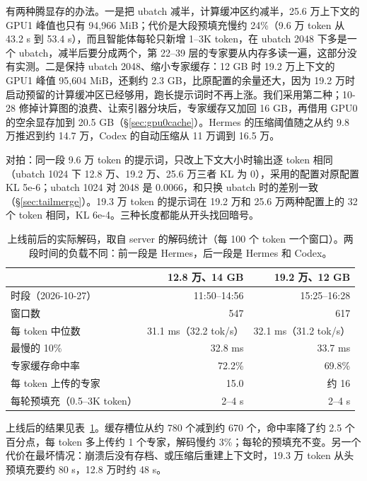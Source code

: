\documentclass[11pt,a4paper]{article}
\newcommand{\tps}{tok/s}
\begin{document}
有两种腾显存的办法。一是把 ubatch 减半，计算缓冲区约减半，25.6 万上下文的 GPU1 峰值也只有 94,966 MiB；代价是大段预填充慢约 24\%（9.6 万 token 从 43.2 s 到 53.4 s），而且智能体每轮只新增 1--3K token，在 ubatch 2048 下多是一个 ubatch，减半后要分成两个，第 22--39 层的专家要从内存多读一遍，这部分没有实测。二是保持 ubatch 2048、缩小专家缓存：12 GB 时 19.2 万上下文的 GPU1 峰值 95,604 MiB，还剩约 2.3 GB，比原配置的余量还大，因为 19.2 万时启动预留的计算缓冲区已经够用，跑长提示词时不再上涨。我们采用第二种；10-28 修掉计算图的浪费、让索引器分块后，专家缓存又加回 16 GB，再借用 GPU0 的空余显存加到 20.5 GB（\S\ref{sec:gpu0cache}）。Hermes 的压缩阈值随之从约 9.8 万推迟到约 14.7 万，Codex 的自动压缩从 11 万调到 16.5 万。

对拍：同一段 9.6 万 token 的提示词，只改上下文大小时输出逐 token 相同（ubatch 1024 下 12.8 万、19.2 万、25.6 万三者 KL 为 0），采用的配置对原配置 KL 5e-6；ubatch 1024 对 2048 是 0.0066，和只换 ubatch 时的差别一致（\S\ref{sec:tailmerge}）。19.3 万 token 的提示词在 19.2 万和 25.6 万两种配置上的 32 个 token 相同，KL 6e-4。三种长度都能从开头找回暗号。

\begin{table}[h]
  \centering
  \small
  \caption{上线前后的实际解码，取自 server 的解码统计（每 100 个 token 一个窗口）。两段时间的负载不同：前一段是 Hermes，后一段是 Hermes 和 Codex。}
  \label{tab:ctxdecode}
  \begin{tabular}{@{}l r r@{}}
    \toprule
     & 12.8 万、14 GB & 19.2 万、12 GB \\
    \midrule
    时段（2026-10-27） & 11:50--14:56 & 15:25--16:28 \\
    窗口数 & 547 & 617 \\
    每 token 中位数 & 31.1 ms（32.2 \tps{}） & 32.1 ms（31.2 \tps{}） \\
    最慢的 10\% & 32.8 ms & 33.7 ms \\
    专家缓存命中率 & 72.2\% & 69.8\% \\
    每 token 上传的专家 & 15.0 & 约 16 \\
    每轮预填充（0.5--3K token） & 2--4 s & 2--4 s \\
    \bottomrule
  \end{tabular}
\end{table}

上线后的结果见表~\ref{tab:ctxdecode}。缓存槽位从约 780 个减到约 670 个，命中率降了约 2.5 个百分点，每 token 多上传约 1 个专家，解码慢约 3\%；每轮的预填充不变。另一个代价在最坏情况：崩溃后没有存档、或压缩后重建上下文时，19.3 万 token 从头预填充要约 80 s，12.8 万时约 48 s。
\end{document}
